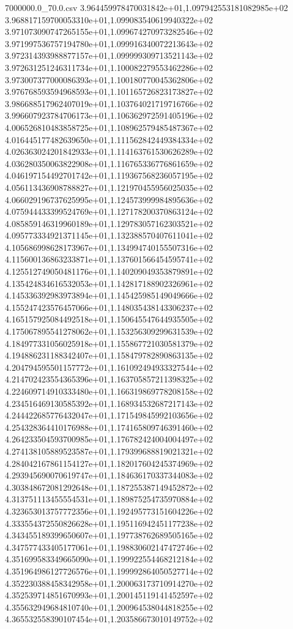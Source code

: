\begin{filecontents*}{7000000.0_70.0.csv}
3.964459978470031842e+01,1.097942553181082985e+02
3.968817159700053310e+01,1.099083540619940322e+02
3.971073090747265155e+01,1.099674270973282546e+02
3.971997536757194780e+01,1.099916340072213643e+02
3.972314393988877157e+01,1.099999309713521143e+02
3.972631251246311734e+01,1.100082279553462286e+02
3.973007377000086393e+01,1.100180770045362806e+02
3.976768593594968593e+01,1.101165726823173827e+02
3.986688517962407019e+01,1.103764021719716766e+02
3.996607923784706173e+01,1.106362972591405196e+02
4.006526810483858725e+01,1.108962579485487367e+02
4.016445177482639650e+01,1.111562842449384334e+02
4.026363024201842933e+01,1.114163761530626289e+02
4.036280350063822908e+01,1.116765336776861659e+02
4.046197154492701742e+01,1.119367568236057195e+02
4.056113436908788827e+01,1.121970455956025035e+02
4.066029196737625995e+01,1.124573999984895636e+02
4.075944433399524769e+01,1.127178200370863124e+02
4.085859146319960189e+01,1.129783057162303521e+02
4.095773334921371145e+01,1.132388570407611041e+02
4.105686998628173967e+01,1.134994740155507316e+02
4.115600136863233871e+01,1.137601566454595741e+02
4.125512749050481176e+01,1.140209049353879891e+02
4.135424834616532053e+01,1.142817188902326961e+02
4.145336392983973894e+01,1.145425985149049666e+02
4.155247423576457066e+01,1.148035438143306237e+02
4.165157925084492518e+01,1.150645547644935505e+02
4.175067895541278062e+01,1.153256309299631539e+02
4.184977331056025918e+01,1.155867721030581379e+02
4.194886231188342407e+01,1.158479782890863135e+02
4.204794595501157772e+01,1.161092494933327544e+02
4.214702423554365396e+01,1.163705857211398325e+02
4.224609714910333480e+01,1.166319869778208158e+02
4.234516469130585392e+01,1.168934532687217143e+02
4.244422685776432047e+01,1.171549845992103656e+02
4.254328364410176988e+01,1.174165809746391460e+02
4.264233504593700985e+01,1.176782424004004497e+02
4.274138105889523587e+01,1.179399688819021321e+02
4.284042167861154127e+01,1.182017604245374969e+02
4.293945690070619747e+01,1.184636170337344083e+02
4.303848672081292648e+01,1.187255387149452872e+02
4.313751113455554531e+01,1.189875254735970884e+02
4.323653013757772356e+01,1.192495773151604226e+02
4.333554372550826628e+01,1.195116942451177238e+02
4.343455189399650607e+01,1.197738762689505165e+02
4.347577433405177061e+01,1.198830602147472746e+02
4.351699583349665090e+01,1.199922554468212184e+02
4.351964986127726576e+01,1.199992864050527714e+02
4.352230388458342958e+01,1.200063173710914270e+02
4.352539714851670993e+01,1.200145119141452597e+02
4.355632949684810740e+01,1.200964538044818255e+02
4.365532558390107454e+01,1.203586673010149752e+02

\end{filecontents*}
